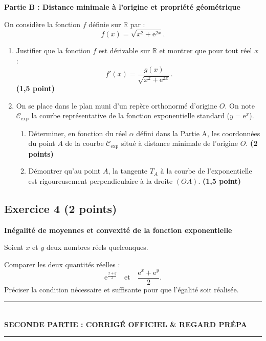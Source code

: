 \documentclass[11pt,a4paper]{article}
\newcommand{\R}{\mathbb{R}}
\newcommand{\e}{\mathrm{e}}
\begin{document}
\medskip
\textbf{Partie B : Distance minimale à l'origine et propriété géométrique}

On considère la fonction $f$ définie sur $\R$ par :
\[
f(x) = \sqrt{x^2 + \e^{2x}}.
\]
\begin{enumerate}[label=\textbf{\arabic*.}]
    \item Justifier que la fonction $f$ est dérivable sur $\R$ et montrer que pour tout réel $x$ :
    \[
    f'(x) = \frac{g(x)}{\sqrt{x^2 + \e^{2x}}}.
    \] \hfill \textbf{(1{,}5 point)}
    \item On se place dans le plan muni d'un repère orthonormé d'origine $O$. On note $\mathcal{C}_{\exp}$ la courbe représentative de la fonction exponentielle standard ($y = \e^x$).
    \begin{enumerate}[label=\textbf{(\alph*)}]
        \item Déterminer, en fonction du réel $\alpha$ défini dans la Partie A, les coordonnées du point $A$ de la courbe $\mathcal{C}_{\exp}$ situé à distance minimale de l'origine $O$. \hfill \textbf{(2 points)}
        \item Démontrer qu'au point $A$, la tangente $T_A$ à la courbe de l'exponentielle est rigoureusement perpendiculaire à la droite $(OA)$. \hfill \textbf{(1{,}5 point)}
    \end{enumerate}
\end{enumerate}

\vspace{0.5cm}

\subsection*{Exercice 4 \hfill \normalfont\normalsize (2 points)}
\textbf{Inégalité de moyennes et convexité de la fonction exponentielle}

\medskip
Soient $x$ et $y$ deux nombres réels quelconques.

Comparer les deux quantités réelles :
\[
\e^{\frac{x+y}{2}} \quad \text{et} \quad \frac{\e^x + \e^y}{2}.
\]
Préciser la condition nécessaire et suffisante pour que l'égalité soit réalisée.

\newpage

\begin{center}
    \rule{0.35\textwidth}{0.8pt}\\[0.15cm]
    {\Large \bfseries SECONDE PARTIE : CORRIGÉ OFFICIEL \& REGARD PRÉPA}\\[0.1cm]
    \rule{0.35\textwidth}{0.8pt}
\end{center}
\end{document}
